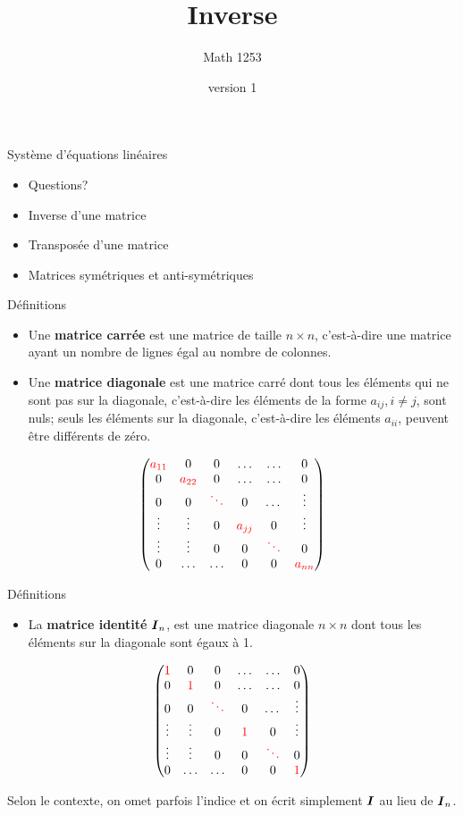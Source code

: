 \documentclass[french]{beamer}
\title{Inverse}
\author{Math 1253} %
\date{version 1}   %
\begin{document}
	\frame{\titlepage}
	
	\begin{frame}{Système d'équations linéaires}
	\begin{itemize}
	\item Questions?
	\item Inverse d'une matrice
	\item Transposée d'une matrice
	\item Matrices symétriques et anti-symétriques
	\end{itemize}
\end{frame}	

\begin{frame}{Définitions}
\begin{itemize}
\item Une \textbf{matrice carrée} est une matrice de taille $n\times n$, c'est-à-dire une matrice ayant un nombre de lignes égal au nombre de colonnes.
\item Une \textbf{matrice diagonale} est une matrice carré dont tous les éléments qui ne sont pas sur la diagonale,
c'est-à-dire les éléments de la forme $a_{ij}, i\ne j$, sont nuls; seuls les éléments sur la diagonale,
c'est-à-dire les éléments $a_{ii}$, peuvent être différents de zéro.
\end{itemize}


\[
\begin{pmatrix}
{\color{red}a_{11}} & 0 & 0 & \ldots & \ldots & 0 \\
0 & {\color{red}a_{22}} & 0 & \ldots & \ldots & 0\\
0 & 0 & {\color{red}\ddots} & 0 & \dots & \vdots\\
\vdots & \vdots& 0& {\color{red}a_{jj}} & 0& \vdots \\
\vdots & \vdots & 0 & 0 & {\color{red}\ddots}& 0 \\
 0 & \ldots &\ldots & 0 & 0 & {\color{red}a_{nn}}
\end{pmatrix}
\]
\end{frame}


\begin{frame}{Définitions}
\begin{itemize}
\item La \textbf{matrice identité} $\boldsymbol{I}_n$, est une matrice diagonale $n\times n$ dont tous les éléments sur la diagonale sont égaux à 1.  
\end{itemize}


\[
\begin{pmatrix}
{\color{red}1} & 0 & 0 & \ldots & \ldots & 0 \\
0 & {\color{red}1} & 0 & \ldots & \ldots & 0\\
0 & 0 & {\color{red}\ddots} & 0 & \dots & \vdots\\
\vdots & \vdots& 0& {\color{red}1} & 0& \vdots \\
\vdots & \vdots & 0 & 0 & {\color{red}\ddots}& 0 \\
 0 & \ldots &\ldots & 0 & 0 & {\color{red}1}
\end{pmatrix}
\]

Selon le contexte, on omet parfois l'indice et on écrit simplement $\boldsymbol{I}$ au lieu de
$\boldsymbol{I}_n$.
\end{frame}
	
\end{document}
